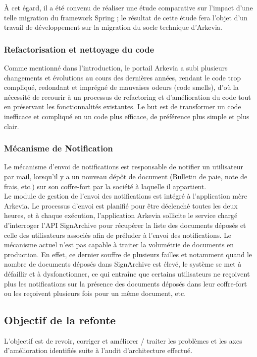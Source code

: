 À cet égard, il a été convenu de réaliser une étude comparative sur l'impact d'une telle migration du framework Spring ; le résultat de cette étude fera l'objet d'un travail de développement sur la migration du socle technique d'Arkevia.

\subsubsection{Refactorisation et nettoyage du code}
Comme mentionné dans l'introduction, le portail Arkevia a subi plusieurs changements et évolutions au cours des dernières années, rendant le code trop compliqué, redondant et imprégné de mauvaises odeurs (code smells), d'où la nécessité de recourir à un processus de refactoring et d'amélioration du code tout en préservant les fonctionnalités existantes. Le but est de transformer un code inefficace et compliqué en un code plus efficace, de préférence plus simple et plus clair.
\subsubsection{Mécanisme de Notification}
Le mécanisme d'envoi de notifications est responsable de notifier un utilisateur par mail, lorsqu'il y a un nouveau dépôt de document (Bulletin de paie, note de frais, etc.) sur son coffre-fort par la société à laquelle il appartient.\\

Le module de gestion de l'envoi des notifications est intégré à l'application mère Arkevia. Le processus d'envoi est planifié pour être déclenché toutes les deux heures, et à chaque exécution, l'application Arkevia sollicite le service chargé d'interroger l'API SignArchive pour récupérer la liste des documents déposés et celle des utilisateurs associés afin de préluder à l'envoi des notifications.
Le mécanisme actuel n'est pas capable à traiter la volumétrie de documents en production. En effet, ce dernier souffre de plusieurs failles et notamment quand le nombre de documents déposés dans SignArchive est élevé, le système se met à défaillir et à dysfonctionner, ce qui entraîne que certains utilisateurs ne reçoivent plus les notifications sur la présence des documents déposés dans leur coffre-fort ou les reçoivent plusieurs fois pour un même document, etc. 

\subsection{Objectif de la refonte}
L'objectif est de revoir, corriger et améliorer / traiter les problèmes et les axes d'amélioration identifiés suite à l'audit d'architecture effectué.

